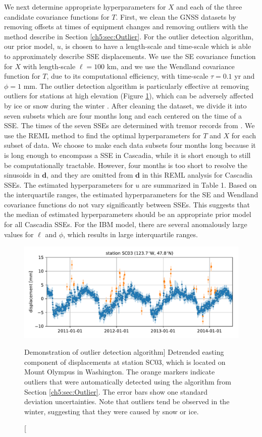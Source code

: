 We next determine appropriate hyperparameters for $X$ and each of the
three candidate covariance functions for $T$. First, we clean the GNSS
datasets by removing offsets at times of equipment changes and
removing outliers with the method describe in Section
\ref{ch5:sec:Outlier}. For the outlier detection algorithm, our prior
model, $u$, is chosen to have a length-scale and time-scale which is
able to approximately describe SSE displacements. We use the SE
covariance function for $X$ with length-scale $\ell = 100$ km, and we
use the Wendland covariance function for $T$, due to its computational
efficiency, with time-scale $\tau = 0.1$ yr and $\phi = 1$ mm.  The
outlier detection algorithm is particularly effective at removing
outliers for stations at high elevation (Figure
\ref{ch5:fig:Outliers}), which can be adversely affected by ice or
snow during the winter \citep{Lisowski2008}. After cleaning the
dataset, we divide it into seven subsets which are four months long
and each centered on the time of a SSE. The times of the seven SSEs
are determined with tremor records from \cite{Wech2010}. We use the
REML method to find the optimal hyperparameters for $T$ and $X$ for
each subset of data. We choose to make each data subsets four months
long because it is long enough to encompass a SSE in Cascadia, while
it is short enough to still be computationally tractable. However,
four months is too short to resolve the sinusoids in $\mathbf{d}$, and
they are omitted from $\mathbf{d}$ in this REML analysis for Cascadia
SSEs. The estimated hyperparameters for $u$ are summarized in Table 1.
Based on the interquartile ranges, the estimated hyperparameters for
the SE and Wendland covariance functions do not vary significantly
between SSEs. This suggests that the median of estimated
hyperparameters should be an appropriate prior model for all Cascadia
SSEs. For the IBM model, there are several anomalously large values
for $\ell$ and $\phi$, which results in large interquartile ranges.

\begin{figure}
\includegraphics{ch5/figures/outliers/outliers.pdf}
\caption
[Demonstration of outlier detection algorithm]
{Detrended easting component of displacements at station SC03,
which is located on Mount Olympus in Washington. The orange markers
indicate outliers that were automatically detected using the algorithm
from Section \ref{ch5:sec:Outlier}. The error bars show one standard
deviation uncertainties. Note that outliers tend be observed in the
winter, suggesting that they were caused by snow or ice.}
\label{ch5:fig:Outliers}
\end{figure}

